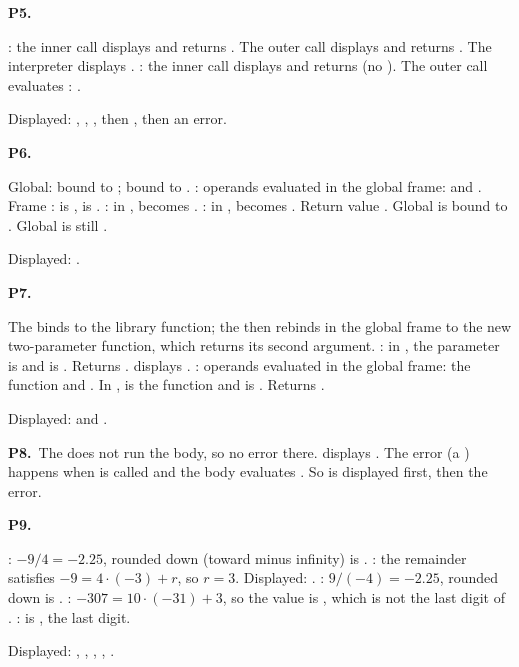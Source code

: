 \documentclass[10pt]{scrartcl}
\begin{document}
\begin{prob}\textbf{P5.}
\begin{steps}
  \ii {}: the inner call displays  and returns . The outer call displays  and returns . The interpreter displays .
  \ii {}: the inner call displays  and returns  (no ). The outer call evaluates : .
\end{steps}
Displayed: , , , then , then an error.
\end{prob}

\begin{prob}\textbf{P6.}
\begin{steps}
  \ii Global:  bound to ;  bound to .
  \ii {}: operands evaluated in the global frame:  and .
  \ii Frame :  is ,  is .
  \ii {}: in ,  becomes . : in ,  becomes .
  \ii Return value . Global  is bound to . Global  is still .
\end{steps}
Displayed: .
\end{prob}

\begin{prob}\textbf{P7.}
\begin{steps}
  \ii The  binds  to the library function; the  then rebinds  in the global frame to the new two-parameter function, which returns its second argument.
  \ii {}: in , the parameter  is  and  is . Returns .  displays .
  \ii {}: operands evaluated in the global frame: the function and . In ,  is the function and  is . Returns .
\end{steps}
Displayed:  and .
\end{prob}

\begin{prob}\textbf{P8.}\ The  does not run the body, so no error there.  displays . The error (a ) happens when  is called and the body evaluates . So  is displayed first, then the error.
\end{prob}

\begin{prob}\textbf{P9.}
\begin{steps}
  \ii {}: $-9/4 = -2.25$, rounded down (toward minus infinity) is .
  \ii {}: the remainder satisfies $-9 = 4 \cdot (-3) + r$, so $r = 3$. Displayed: .
  \ii {}: $9/(-4) = -2.25$, rounded down is .
  \ii {}: $-307 = 10 \cdot (-31) + 3$, so the value is , which is not the last digit of .
  \ii {}:  is , the last digit.
\end{steps}
Displayed: , , , , .
\end{prob}
\end{document}
